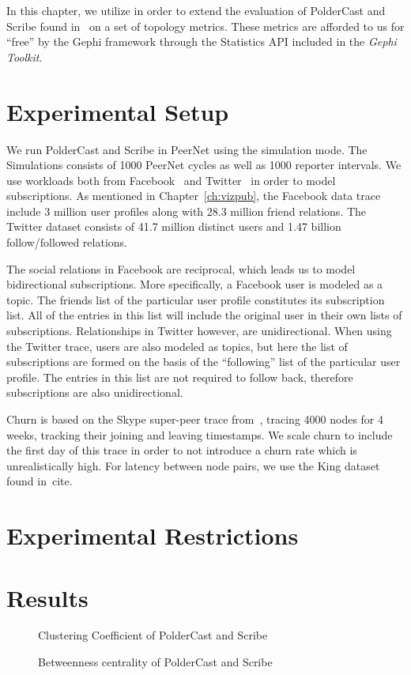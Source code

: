 In this chapter, we utilize \demo{} in order to extend the evaluation of
PolderCast and Scribe found in~\cite{Setty:2012} on a set of topology
metrics. These metrics are afforded to us for ``free'' by the Gephi
framework through the Statistics API included in the \emph{Gephi
    Toolkit}.

\section{Experimental Setup}

We run PolderCast and Scribe in PeerNet using the simulation mode. The
Simulations consists of 1000 PeerNet cycles as well as 1000 reporter
intervals. We use workloads both from Facebook~\cite{} and
Twitter~\cite{} in order to model subscriptions. As mentioned in
Chapter~\ref{ch:vizpub}, the Facebook data trace include 3 million user
profiles along with 28.3 million friend relations. The Twitter dataset
consists of 41.7 million distinct users and 1.47 billion
follow/followed relations.

The social relations in Facebook are reciprocal, which leads us to model
bidirectional subscriptions. More specifically, a Facebook user is
modeled as a topic. The friends list of the particular user profile
constitutes its subscription list. All of the entries in this list will
include the original user in their own lists of subscriptions.
Relationships in Twitter however, are unidirectional. When using the
Twitter trace, users are also modeled as topics, but here the list of
subscriptions are formed on the basis of the ``following'' list of the
particular  user profile. The entries in this list are not required to
follow back, therefore subscriptions are also unidirectional.

Churn is based on the Skype super-peer trace from~\cite{}, tracing 4000
nodes for 4 weeks, tracking their joining and leaving timestamps. We
scale churn to include the first day of this trace in order to not
introduce a churn rate which is unrealistically high. For latency
between node pairs, we use the King dataset found in~cite{}.

\section{Experimental Restrictions}

\section{Results}

\begin{figure}
    \centering
    
    \caption{Clustering Coefficient of PolderCast and Scribe}
    \label{fig:eval_cc}
\end{figure}

\begin{figure}
    \centering
    
    \caption{Betweenness centrality of PolderCast and Scribe}
    \label{fig:eval_betweenness}
\end{figure}
